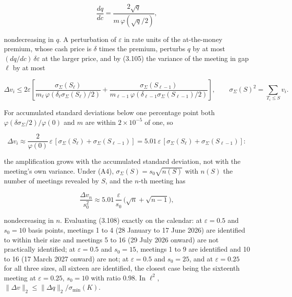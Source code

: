 \documentclass[11pt]{article}
\begin{document}
\begin{equation*}
\frac{dq}{dc} = \frac{2\sqrt q}{m\,\varphi(\sqrt q / 2)}, \tag{3.107}\label{eq:3.107}
\end{equation*}

nondecreasing in \(q\). A perturbation of \(\varepsilon\) in rate units of the at-the-money premium, whose cash price is \(\delta\) times the premium, perturbs \(q\) by at most \((dq/dc)\,\delta\varepsilon\) at the larger price, and by (3.105) the variance of the meeting in gap \(\ell\) by at most

\begin{equation*}
\Delta v_i \le 2\varepsilon \left[ \frac{\sigma_\Sigma(S_\ell)}{m_\ell\, \varphi(\delta_\ell \sigma_\Sigma(S_\ell)/2)} + \frac{\sigma_\Sigma(S_{\ell-1})}{m_{\ell-1}\, \varphi(\delta_{\ell-1} \sigma_\Sigma(S_{\ell-1})/2)} \right], \qquad \sigma_\Sigma(S)^2 = \sum_{T_i \le S} v_i. \tag{3.108}\label{eq:3.108}
\end{equation*}

For accumulated standard deviations below one percentage point both \(\varphi(\delta\sigma_\Sigma/2)/\varphi(0)\) and \(m\) are within \(2 \times 10^{-5}\) of one, so

\begin{equation*}
\Delta v_i \approx \frac{2}{\varphi(0)}\, \varepsilon\, [\sigma_\Sigma(S_\ell) + \sigma_\Sigma(S_{\ell-1})] = 5.01\, \varepsilon\, [\sigma_\Sigma(S_\ell) + \sigma_\Sigma(S_{\ell-1})]: \tag{3.109}\label{eq:3.109}
\end{equation*}

the amplification grows with the accumulated standard deviation, not with the meeting's own variance. Under (A4), \(\sigma_\Sigma(S) = s_0 \sqrt{n(S)}\) with \(n(S)\) the number of meetings revealed by \(S\), and the \(n\)-th meeting has

\begin{equation*}
\frac{\Delta v_n}{s_0^2} \approx 5.01\, \frac{\varepsilon}{s_0}\, \bigl( \sqrt n + \sqrt{n - 1} \bigr), \tag{3.110}\label{eq:3.110}
\end{equation*}

nondecreasing in \(n\). Evaluating (3.108) exactly on the calendar: at \(\varepsilon = 0.5\) and \(s_0 = 10\) basis points, meetings 1 to 4 (28 January to 17 June 2026) are identified to within their size and meetings 5 to 16 (29 July 2026 onward) are not practically identified; at \(\varepsilon = 0.5\) and \(s_0 = 15\), meetings 1 to 9 are identified and 10 to 16 (17 March 2027 onward) are not; at \(\varepsilon = 0.5\) and \(s_0 = 25\), and at \(\varepsilon = 0.25\) for all three sizes, all sixteen are identified, the closest case being the sixteenth meeting at \(\varepsilon = 0.25\), \(s_0 = 10\) with ratio \(0.98\). In \(\ell^2\), \(\|\Delta v\|_2 \le \|\Delta q\|_2 / \sigma_{\min}(K)\).
\end{document}
